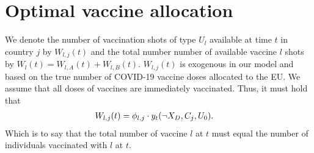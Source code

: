 \section{Optimal vaccine allocation}\label{sec:vaccine_allocation}
We denote the number of vaccination shots of type $U_l$ available at time $t$ in country $j$ by $W_{l,j}(t)$ and the total number number of available vaccine $l$ shots by $W_l(t) = W_{l,A}(t) + W_{l,B}(t)$. $W_{l,j}(t)$ is exogenous in our model and based on the true number of COVID-19 vaccine doses allocated to the EU. We assume that all doses of vaccines are immediately vaccinated. Thus, it must hold that 
\begin{align}
\label{eq:vaccine_country}
W_{l,j}(t) &= \phi_{l, j} \cdot y_t(\neg X_D, C_j, U_0)  . 
\end{align}
Which is to say that the total number of vaccine $l$ at $t$ must equal the number of individuals vaccinated with $l$ at $t$. \\

